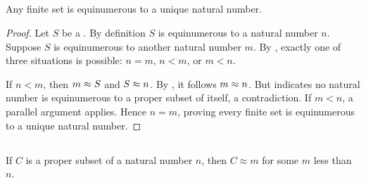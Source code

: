\documentclass{report}
\begin{document}
\subsection{}%

  \begin{corollary}[6E]
    Any finite set is equinumerous to a unique natural number.
  \end{corollary}

  \begin{proof}
    Let $S$ be a .
    By definition $S$ is equinumerous to a natural number $n$.
    Suppose $S$ is equinumerous to another natural number $m$.
    By , exactly one of three
      situations is possible: $n = m$, $n < m$, or $m < n$.

    If $n < m$, then $m \approx S$ and $S \approx n$.
    By , it follows $m \approx n$.
    But  indicates no natural number is
      equinumerous to a proper subset of itself, a contradiction.
    If $m < n$, a parallel argument applies.
    Hence $n = m$, proving every finite set is equinumerous to a unique natural
      number.
  \end{proof}

\subsection{}%

  \begin{lemma}[6F]
    If $C$ is a proper subset of a natural number $n$, then $C \approx m$ for
      some $m$ less than $n$.
  \end{lemma}
\end{document}

